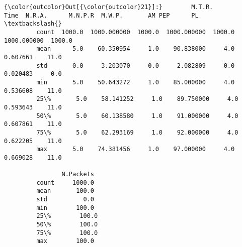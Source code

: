 \documentclass[11pt]{article}
\begin{document}
\begin{Verbatim}[commandchars=\\\{\}]
{\color{outcolor}Out[{\color{outcolor}21}]:}        M.T.R.         Time  N.R.A.      M.N.P.R  M.W.P.       AM PEP      PL  \textbackslash{}
         count  1000.0  1000.000000  1000.0  1000.000000  1000.0  1000.000000  1000.0   
         mean      5.0    60.350954     1.0    90.838000     4.0     0.607661    11.0   
         std       0.0     3.203070     0.0     2.082809     0.0     0.020483     0.0   
         min       5.0    50.643272     1.0    85.000000     4.0     0.536608    11.0   
         25\%       5.0    58.141252     1.0    89.750000     4.0     0.593643    11.0   
         50\%       5.0    60.138580     1.0    91.000000     4.0     0.607861    11.0   
         75\%       5.0    62.293169     1.0    92.000000     4.0     0.622205    11.0   
         max       5.0    74.381456     1.0    97.000000     4.0     0.669028    11.0   
         
                N.Packets  
         count     1000.0  
         mean       100.0  
         std          0.0  
         min        100.0  
         25\%        100.0  
         50\%        100.0  
         75\%        100.0  
         max        100.0  
\end{Verbatim}
            
\end{document}
